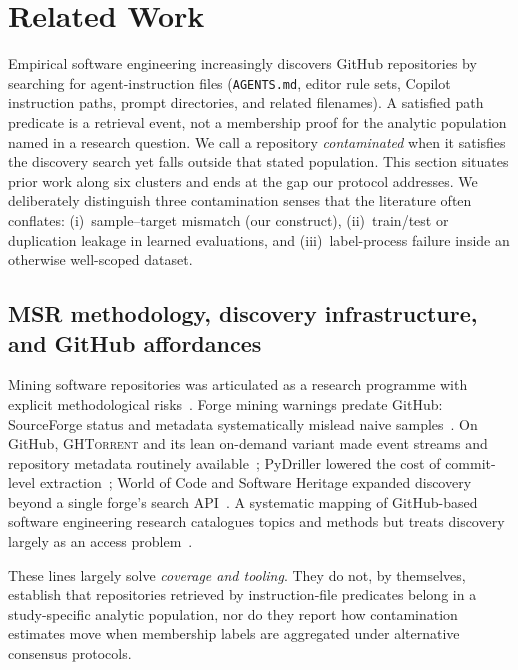\section{Related Work}
\label{sec:related-work}


Empirical software engineering increasingly discovers GitHub repositories by searching for agent-instruction files (\texttt{AGENTS.md}, editor rule sets, Copilot instruction paths, prompt directories, and related filenames).
A satisfied path predicate is a retrieval event, not a membership proof for the analytic population named in a research question.
We call a repository \emph{contaminated} when it satisfies the discovery search yet falls outside that stated population.
This section situates prior work along six clusters and ends at the gap our protocol addresses.
We deliberately distinguish three contamination senses that the literature often conflates: (i)~sample--target mismatch (our construct), (ii)~train/test or duplication leakage in learned evaluations, and (iii)~label-process failure inside an otherwise well-scoped dataset.

\subsection{MSR methodology, discovery infrastructure, and GitHub affordances}
\label{subsec:rw-msr}

Mining software repositories was articulated as a research programme with explicit methodological risks~\cite{hassan2008road}.
Forge mining warnings predate GitHub: SourceForge status and metadata systematically mislead naive samples~\cite{howison2004perils}.
On GitHub, \textsc{GHTorrent} and its lean on-demand variant made event streams and repository metadata routinely available~\cite{gousios2012ghtorrent,gousios2014lean}; PyDriller lowered the cost of commit-level extraction~\cite{spadini2018pydriller}; World of Code and Software Heritage expanded discovery beyond a single forge's search API~\cite{ma2019woc,pietri2019swh,dicossmo2018swh}.
A systematic mapping of GitHub-based software engineering research catalogues topics and methods but treats discovery largely as an access problem~\cite{cosentino2017mapping}.

These lines largely solve \emph{coverage and tooling}.
They do not, by themselves, establish that repositories retrieved by instruction-file predicates belong in a study-specific analytic population, nor do they report how contamination estimates move when membership labels are aggregated under alternative consensus protocols.

